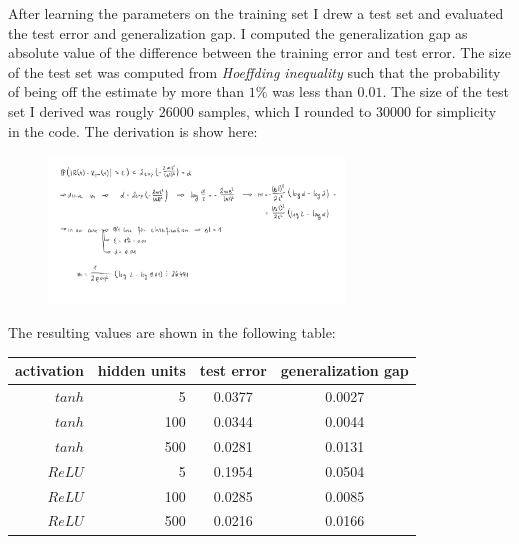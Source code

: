 \documentclass[a4paper,11pt]{article}
\begin{document}
After learning the parameters on the training set I drew a test set and evaluated the test error and generalization gap.
I computed the generalization gap as absolute value of the difference between the training error and test error.
The size of the test set was computed from \textit{Hoeffding inequality} such that the probability of being off the estimate by more than $1\%$ was less than $0.01$.
The size of the test set I derived was rougly $26000$ samples, which I rounded to $30000$ for simplicity in the code.
The derivation is show here:
\begin{figure}[ht]
    \centering
    \includegraphics[width=0.7\textwidth]{hoeffding_test_size.png}
\end{figure}

\newpage

The resulting values are shown in the following table:
\begin{table}[ht]
    \centering
    \begin{tabular}{ r | r | c | c }
        activation & hidden units & test error & generalization gap \\
        \hline
        $tanh$     & 5            & 0.0377     & 0.0027             \\
        $tanh$     & 100          & 0.0344     & 0.0044             \\
        $tanh$     & 500          & 0.0281     & 0.0131             \\
        $ReLU$     & 5            & 0.1954     & 0.0504             \\
        $ReLU$     & 100          & 0.0285     & 0.0085             \\
        $ReLU$     & 500          & 0.0216     & 0.0166             \\
    \end{tabular}
\end{table}
\end{document}
